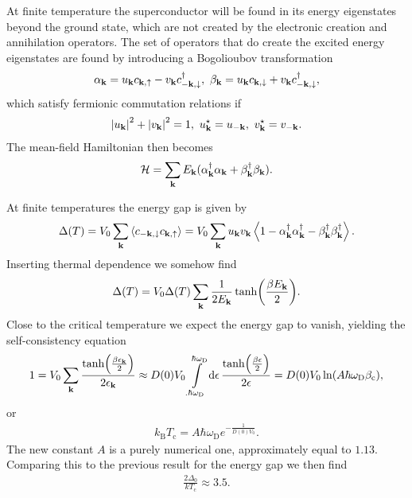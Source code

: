 At finite temperature the superconductor will be found in its energy eigenstates beyond the ground state, which are not created by the electronic creation and annihilation operators. The set of operators that do create the excited energy eigenstates are found by introducing a Bogolioubov transformation
\begin{align*}
	\alpha_{\vb{k}} = u_{\vb{k}}c_{\vb{k}, \uparrow} - v_{\vb{k}}c_{-\vb{k}, \downarrow}^{\dagger},\ \beta_{\vb{k}} = u_{\vb{k}}c_{\vb{k}, \downarrow} + v_{\vb{k}}c_{-\vb{k}, \downarrow}^{\dagger},
\end{align*}
which satisfy fermionic commutation relations if
\begin{align*}
	\abs{u_{\vb{k}}}^{2} + \abs{v_{\vb{k}}}^{2} = 1,\ u_{\vb{k}}^{\star} = u_{-\vb{k}},\ v_{\vb{k}}^{\star} = v_{-\vb{k}}.
\end{align*}
The mean-field Hamiltonian then becomes
\begin{align*}
	\mathcal{H} = \sum\limits_{\vb{k}}E_{\vb{k}}(\alpha_{\vb{k}}^{\dagger}\alpha_{\vb{k}} + \beta_{\vb{k}}^{\dagger}\beta_{\vb{k}}).
\end{align*}

At finite temperatures the energy gap is given by
\begin{align*}
	\Delta(T) = V_{0}\sum\limits_{\vb{k}}\expval{c_{-\vb{k}, \downarrow}c_{\vb{k}, \uparrow}} = V_{0}\sum\limits_{\vb{k}}u_{\vb{k}}v_{\vb{k}}\expval{1 - \alpha_{\vb{k}}\ensuremath{^{\dagger}}\alpha_{\vb{k}}\ensuremath{^{\dagger}}- \beta_{\vb{k}}\ensuremath{^{\dagger}}\beta_{\vb{k}}\ensuremath{^{\dagger}}}.
\end{align*}
Inserting thermal dependence we somehow find
\begin{align*}
	\Delta(T) = V_{0}\Delta(T)\sum\limits_{\vb{k}}\frac{1}{2E_{\vb{k}}}\tanh(\frac{\beta E_{\vb{k}}}{2}).
\end{align*}
Close to the critical temperature we expect the energy gap to vanish, yielding the self-consistency equation
\begin{align*}
	1 = V_{0}\sum\limits_{\vb{k}}\frac{\tanh(\frac{\beta\epsilon_{\vb{k}}}{2})}{2\epsilon_{\vb{k}}} \approx D(0)V_{0}\int\limits_{.\hbar\omega_{\text{D}}}^{\hbar\omega_{\text{D}}}\dd{\epsilon}\frac{\tanh(\frac{\beta\epsilon}{2})}{2\epsilon} = D(0)V_{0}\ln(A\hbar\omega_{\text{D}}\beta_{\text{c}}),
\end{align*}
or
\begin{align*}
	k_{\text{B}}T_{\text{c}} = A\hbar\omega_{\text{D}}e^{-\frac{1}{D(0)V_{0}}}.
\end{align*}
The new constant $A$ is a purely numerical one, approximately equal to $1.13$. Comparing this to the previous result for the energy gap we then find
\begin{align*}
	\frac{2\Delta_{0}}{kT_{\text{c}}} \approx 3.5.
\end{align*}

